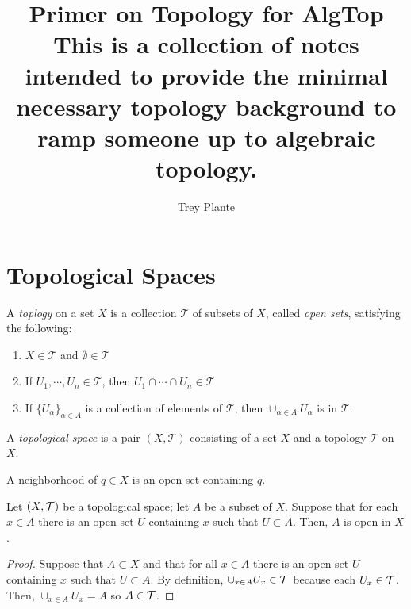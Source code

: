 \documentclass{article}
\author{Trey Plante}
\title{Primer on Topology for AlgTop \\
  \normalsize This is a collection of notes intended to provide the minimal necessary topology background to ramp someone up to algebraic topology.}
\date{}
\begin{document}
\maketitle
\tableofcontents

\section{Topological Spaces}

\begin{definition}[Lee]
  A \textit{toplogy} on a set $X$ is a collection $\mathcal{T}$ of subsets of $X$, called \textit{open sets}, satisfying the following:

  \begin{enumerate}
    \item $X \in \mathcal{T}$ and $\emptyset \in \mathcal{T}$

    \item If $U_{1}, \cdots, U_{n} \in \mathcal{T}$, then $U_{1} \cap \cdots \cap U_{n} \in \mathcal{T}$

    \item If $\{ U_{\alpha}\}_{\alpha \in A}$ is a collection of elements of $\mathcal{T}$, then $\cup_{\alpha \in A} U_{\alpha}$ is in $\mathcal{T}$.
  \end{enumerate}
\end{definition}

\begin{definition}[Lee]
  A \textit{topological space} is a pair $(X, \mathcal{T})$ consisting of a set $X$ and a topology $\mathcal{T}$ on $X$.
\end{definition}

\begin{remark}[Lee]
  A neighborhood of $q \in X$ is an open set containing $q$.
\end{remark}

\begin{lemma}
 Let $(X, \operatorname{\mathcal{T}})$ be a topological space; let $A$ be a subset of $X$. Suppose that for each $x \in A$ there is an open set $U$ containing $x$ such that $U \subset A$. Then, $A$ is open in $X$.
\end{lemma}
\begin{proof}
 Suppose that $A \subset X$ and that for all $x \in A$ there is an open set $U$ containing $x$ such that $U \subset A$. By definition, $\cup_{x \in A} U_{x} \in \operatorname{\mathcal{T}}$ because each $U_{x} \in \operatorname{\mathcal{T}}$. Then, $\cup_{x \in A} U_{x} = A$ so $A \in \operatorname{\mathcal{T}}$.
\end{proof}
\end{document}
